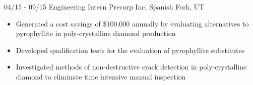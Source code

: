 \documentclass[]{friggeri-cv}
\begin{document}
\begin{entrylist}
  \entry
    {04/15 - 09/15}
    {Engineering Intern}
    {Precorp Inc, Spanish Fork, UT}
    {\vspace{-4mm}
    \begin{itemize}
        \item Generated a cost savings of \$100,000 annually by evaluating alternatives to pyrophyllite in poly-crystalline diamond production
        \item Developed qualification tests for the evaluation of pyrophyllite substitutes
        \item Investigated methods of non-destructive crack detection in poly-crystalline diamond to eliminate time intensive manual inspection
     \end{itemize}\vspace{1mm}}

\end{entrylist}

~
\end{document}
